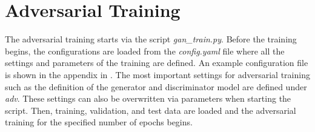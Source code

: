 \section{Adversarial Training}
\label{sec:adv_training}
%
The adversarial training starts via the script \textit{gan\_train.py}.
Before the training begins, the configurations are loaded from the \textit{config.yaml} file where all the settings and parameters of the training are defined.
An example configuration file is shown in the appendix in .
The most important settings for adversarial training such as the definition of the generator and discriminator model are defined under \textit{adv}.
These settings can also be overwritten via parameters when starting the script.
Then, training, validation, and test data are loaded and the adversarial training for the specified number of epochs begins.

